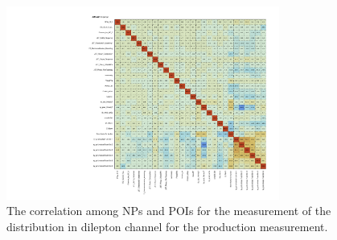 \begin{figure}[ht]
  \centering
  \includegraphics[width=0.8\textwidth]{figures/diff_xsec/dilep_tty_prod_mu_blinded/correlations/tty2l_pt_all_syst/CorrMatrix.pdf}
  \caption{The correlation among NPs and POIs for the measurement of the \ptgamma distribution in dilepton channel for the \tty production measurement.}
  \label{fig:NP_corr_dilep_mu_blinded}
\end{figure}
\FloatBarrier


